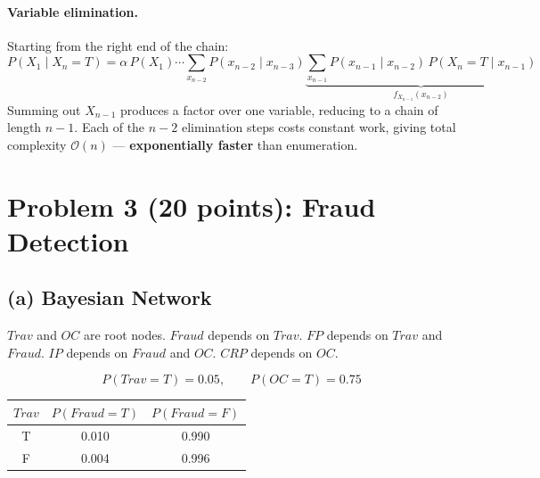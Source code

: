 \documentclass[12pt]{article}
\begin{document}
\paragraph{Variable elimination.}
Starting from the right end of the chain:
\[
P(X_1\mid X_n{=}T)=\alpha\,P(X_1)\cdots\sum_{x_{n-2}}P(x_{n-2}\mid x_{n-3})
\underbrace{\sum_{x_{n-1}}P(x_{n-1}\mid x_{n-2})\,P(X_n{=}T\mid x_{n-1})}_{f_{X_{n-1}}(x_{n-2})}
\]
Summing out $X_{n-1}$ produces a factor over one variable, reducing to a chain
of length $n-1$. Each of the $n-2$ elimination steps costs constant work, giving
total complexity $\mathcal{O}(n)$ --- \textbf{exponentially faster} than enumeration.

\newpage
\section{Problem 3 (20 points): Fraud Detection}

\subsection*{(a) Bayesian Network}

$\textit{Trav}$ and $\textit{OC}$ are root nodes.
$\textit{Fraud}$ depends on $\textit{Trav}$.
$\textit{FP}$ depends on $\textit{Trav}$ and $\textit{Fraud}$.
$\textit{IP}$ depends on $\textit{Fraud}$ and $\textit{OC}$.
$\textit{CRP}$ depends on $\textit{OC}$.

\begin{center}
\end{center}

\[
P(\textit{Trav}{=}T)=0.05,\qquad P(\textit{OC}{=}T)=0.75
\]

\begin{center}
\begin{tabular}{ccc}
\toprule
$\textit{Trav}$ & $P(\textit{Fraud}{=}T)$ & $P(\textit{Fraud}{=}F)$\\
\midrule
T & 0.010 & 0.990\\
F & 0.004 & 0.996\\
\bottomrule
\end{tabular}
\end{center}
\end{document}
